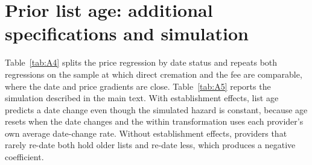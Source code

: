 \section{Prior list age: additional specifications and simulation}
Table~\ref{tab:A4} splits the price regression by date status and repeats both regressions on the sample at which direct cremation and the fee are comparable, where the date and price gradients are close. Table~\ref{tab:A5} reports the simulation described in the main text. With establishment effects, list age predicts a date change even though the simulated hazard is constant, because age resets when the date changes and the within transformation uses each provider's own average date-change rate. Without establishment effects, providers that rarely re-date both hold older lists and re-date less, which produces a negative coefficient.



